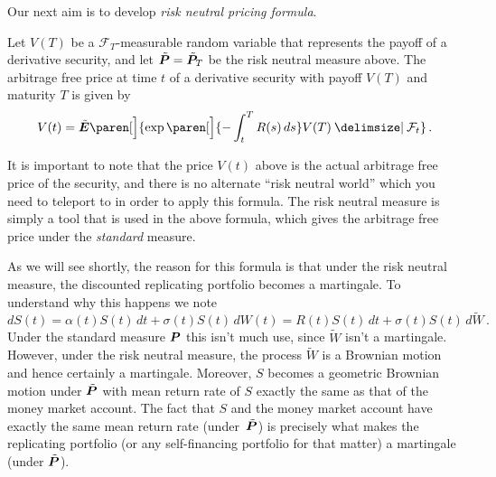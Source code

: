 Our next aim is to develop \emph{risk neutral pricing formula}.

\begin{theorem}\label{t:4rnp}
  Let $V(T)$ be a $\mathcal F_T$-measurable random variable that represents the payoff of a derivative security, and let $\tilde \P = \tilde\P_T$ be the risk neutral measure above.
  The arbitrage free price at time $t$ of a derivative security with payoff $V(T)$ and maturity $T$ is given by
  \begin{equation}\label{e:4rnp}
    V(t) = \tilde\E \paren[\Big]{\exp\paren[\Big]{-\int_t^T R(s) \, ds} V(T) \given \mathcal F_t }\,.
  \end{equation}
\end{theorem}
\begin{remark}
  It is important to note that the price $V(t)$ above is the actual arbitrage free price of the security, and there is no alternate ``risk neutral world'' which you need to teleport to in order to apply this formula.
  The risk neutral measure is simply a tool that is used in the above formula, which gives the arbitrage free price under the \emph{standard} measure.
\end{remark}

As we will see shortly, the reason for this formula is that under the risk neutral measure, the discounted replicating portfolio becomes a martingale.
To understand why this happens we note
\begin{equation}\label{e:4dS}
  dS(t) = \alpha(t) S(t) \, dt + \sigma(t) S(t) \, dW(t)
    = R(t) S(t) \, dt + \sigma(t) S(t) \, d\tilde W\,.
\end{equation}
Under the standard measure $\P$ this isn't much use, since $\tilde W$ isn't a martingale.
However, under the risk neutral measure, the process $\tilde W$ is a Brownian motion and hence certainly a martingale.
Moreover, $S$ becomes a geometric Brownian motion under $\tilde\P$ with mean return rate of $S$ exactly the same as that of the money market account.
The fact that $S$ and the money market account have exactly the same mean return rate (under~$\tilde\P$) is precisely what makes the replicating portfolio (or any self-financing  portfolio for that matter) a martingale (under $\tilde\P$).


